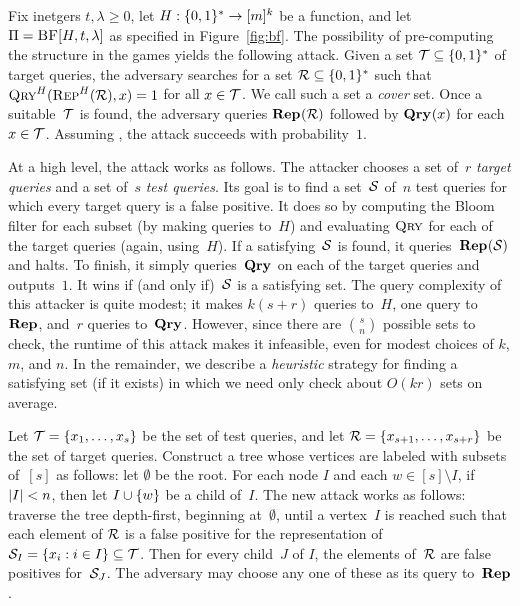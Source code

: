 Fix inetgers $t, \lambda \geq0$, let $H:\{0,1\}^*\to[m]^k$ be a function,  and let
$\Pi = \textsc{BF}[H,t,\lambda]$ as specified in Figure~\ref{fig:bf}.
%
The possibility of pre-computing the structure in the  games yields the
following attack. Given a set $\mathcal{T}\subseteq\{0,1\}^*$ of target queries, the
adversary searches for a set $\mathcal{R}\subseteq\{0,1\}^*$ such that
$\textsc{Qry}^H(\textsc{Rep}^H(\mathcal{R}), x) = 1$ for all $x \in \mathcal{T}$. We call such a set a
\emph{cover} set.
%
Once a suitable~$\mathcal{T}$ is found, the adversary queries $\mathbf{Rep}\hspace{0.5pt}(\mathcal{R})$ followed
by $\mathbf{Qry}\hspace{0.5pt}(x)$ for each $x\in\mathcal{T}$.
%
Assuming , the attack succeeds with
probability~$1$.






At a high level, the attack works as follows. The attacker chooses a set of~$r$
\emph{target queries} and a set of~$s$ \emph{test queries}.  Its goal is to find
a set~$\mathcal{S}$ of~$n$ test queries for which every target query is a false
positive.
%
It does so by computing the Bloom filter for each subset (by making queries
to~$H$) and evaluating $\textsc{Qry}$ for each of the target queries (again, using~$H$).
If a satisfying~$\mathcal{S}$ is found, it queries~$\mathbf{Rep}\hspace{0.5pt}(\mathcal{S})$ and halts.
%
To finish, it simply queries~$\mathbf{Qry}\hspace{0.5pt}$ on each of the target queries and
outputs~$1$. It wins if (and only if)~$\mathcal{S}$ is a satisfying set.
%
The query complexity of this attacker is quite modest; it makes $k(s+r)$ queries
to~$H$, one query to~$\mathbf{Rep}\hspace{0.5pt}$, and~$r$ queries to~$\mathbf{Qry}\hspace{0.5pt}$.  However, since there
are $\binom{s}{n}$ possible sets to check, the runtime of this attack makes it
infeasible, even for modest choices of $k$, $m$, and $n$.
%
In the remainder, we describe a \emph{heuristic} strategy for finding a
satisfying set (if it exists) in which we need only check about $O(kr)$ sets on
average.

Let $\mathcal{T} = \{x_1, \ldots, x_s\}$ be the set of test queries, and let $\mathcal{R} =
\{x_{s+1}, \ldots, x_{s+r}\}$ be the set of target queries.
%
Construct a tree whose vertices are labeled with subsets of~$[s]$ as follows:
%
let $\emptyset$ be the root.
%
For each node $I$ and each $w \in [s] \setminus I$, if $|I| < n$, then let $I
\cup \{ w \}$ be a child of~$I$.
%
The new attack works as follows: traverse the tree depth-first, beginning
at~$\emptyset$, until a vertex~$I$ is reached such that each element of $\mathcal{R}$ is
a false positive for the representation of $\mathcal{S}_I = \{ x_i : i \in I \}
\subseteq \mathcal{T}$.
%
Then for every child~$J$ of $I$, the elements of~$\mathcal{R}$ are false positives
for~$\mathcal{S}_J$. The adversary may choose any one of these as its query
to~$\mathbf{Rep}\hspace{0.5pt}$.

